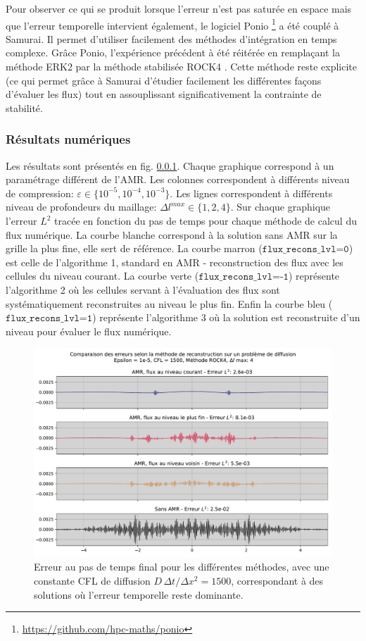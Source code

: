 \label{par:etude_diff_rock4}
Pour observer ce qui se produit lorsque l'erreur n'est pas saturée en espace mais que l'erreur temporelle intervient également, 
le logiciel Ponio \footnote{\href{https://github.com/hpc-maths/ponio}{https://github.com/hpc-maths/ponio}} a été couplé à Samurai.
Il permet d'utiliser facilement des méthodes d'intégration en temps complexe. 
Grâce Ponio, l’expérience précédent à été réitérée en remplaçant la méthode ERK2 par la méthode stabilisée ROCK4 \cite{AbdulleMedovikov2001}. 
Cette méthode reste explicite (ce qui permet grâce à Samurai d'étudier facilement les différentes façons d'évaluer les flux) 
tout en assouplissant significativement la contrainte de stabilité.
\subsubsection{Résultats numériques}
    Les résultats sont présentés en fig. \ref{}. Chaque graphique correspond à un paramétrage différent de l'AMR. 
    Les colonnes correspondent à différents niveau de compression: $\varepsilon \in \{10^{-5}, 10^{-4}, 10^{-3}\}$.
    Les lignes correspondent à différents niveau de profondeurs du maillage: $\Delta l^{max} \in \{1,2,4\}$.
    Sur chaque graphique l'erreur $L^2$ tracée en fonction du pas de temps pour chaque méthode de calcul du flux numérique.
    La courbe blanche correspond à la solution sans AMR sur la grille la plus fine, elle sert de référence.
    La courbe marron ($\texttt{flux\_recons\_lvl=0}$) est celle de l'algorithme 1, standard en AMR - reconstruction des flux avec les cellules du niveau courant.
    La courbe verte  ($\texttt{flux\_recons\_lvl=-1}$) représente l’algorithme 2 où les cellules servant à l'évaluation des flux sont systématiquement reconstruites au niveau le plus fin.
    Enfin la courbe bleu ($\texttt{flux\_recons\_lvl=1}$) représente l'algorithme 3 où la solution est reconstruite d'un niveau pour évaluer le flux numérique.
    \begin{figure}[h!]
    \centering
    \includegraphics[width=\textwidth]{media/4_travail/3/Error_comparaison_according_to_flux_reconstruction_method.pdf}
    \caption{Erreur au pas de temps final pour les différentes méthodes, avec une constante CFL de diffusion $D\,\Delta t / \Delta x^2 = 1500$, correspondant à des solutions où l'erreur temporelle reste dominante.}
    \label{fig:erreur_diffusion_according_to_flux_recons_method}
    \end{figure}
